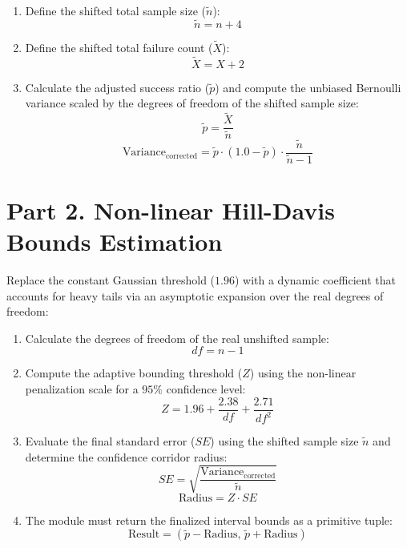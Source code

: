 \documentclass[12pt,a4paper]{article}
\begin{document}
\begin{enumerate}
    \item Define the shifted total sample size ($\tilde{n}$):
    \begin{equation}
    \tilde{n} = n + 4
    \end{equation}
    \item Define the shifted total failure count ($\tilde{X}$):
    \begin{equation}
    \tilde{X} = X + 2
    \end{equation}
    \item Calculate the adjusted success ratio ($\tilde{p}$) and compute the unbiased Bernoulli variance scaled by the degrees of freedom of the shifted sample size:
    \begin{equation}
    \tilde{p} = \frac{\tilde{X}}{\tilde{n}}
    \end{equation}
    \begin{equation}
    \text{Variance}_{\text{corrected}} = \tilde{p} \cdot (1.0 - \tilde{p}) \cdot \frac{\tilde{n}}{\tilde{n} - 1}
    \end{equation}
\end{enumerate}

\section{Part 2. Non-linear Hill-Davis Bounds Estimation}
Replace the constant Gaussian threshold ($1.96$) with a dynamic coefficient that accounts for heavy tails via an asymptotic expansion over the real degrees of freedom:

\begin{enumerate}
    \item Calculate the degrees of freedom of the real unshifted sample:
    \begin{equation}
    df = n - 1
    \end{equation}
    \item Compute the adaptive bounding threshold ($Z$) using the non-linear penalization scale for a $95\%$ confidence level:
    \begin{equation}
    Z = 1.96 + \frac{2.38}{df} + \frac{2.71}{df^2}
    \end{equation}
    \item Evaluate the final standard error ($SE$) using the shifted sample size $\tilde{n}$ and determine the confidence corridor radius:
    \begin{equation}
    SE = \sqrt{\frac{\text{Variance}_{\text{corrected}}}{\tilde{n}}}
    \end{equation}
    \begin{equation}
    \text{Radius} = Z \cdot SE
    \end{equation}
    \item The module must return the finalized interval bounds as a primitive tuple:
    \begin{equation}
    \text{Result} = (\tilde{p} - \text{Radius}, \, \tilde{p} + \text{Radius})
    \end{equation}
\end{enumerate}
\end{document}
